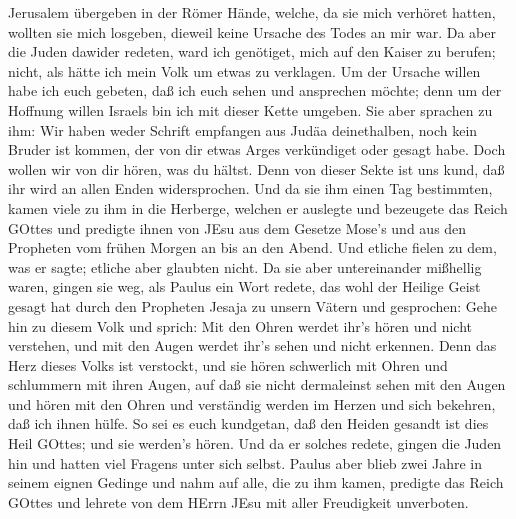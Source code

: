 Jerusalem übergeben in der Römer Hände,  welche, da sie
mich verhöret hatten, wollten sie mich losgeben, dieweil keine Ursache
des Todes an mir war.  Da aber die Juden dawider redeten,
ward ich genötiget, mich auf den Kaiser zu berufen; nicht, als hätte ich
mein Volk um etwas zu verklagen.  Um der Ursache willen
habe ich euch gebeten, daß ich euch sehen und ansprechen möchte; denn um
der Hoffnung willen Israels bin ich mit dieser Kette umgeben.
 Sie aber sprachen zu ihm: Wir haben weder Schrift
empfangen aus Judäa deinethalben, noch kein Bruder ist kommen, der von
dir etwas Arges verkündiget oder gesagt habe.  Doch wollen
wir von dir hören, was du hältst. Denn von dieser Sekte ist uns kund,
daß ihr wird an allen Enden widersprochen.  Und da sie ihm
einen Tag bestimmten, kamen viele zu ihm in die Herberge, welchen er
auslegte und bezeugete das Reich GOttes und predigte ihnen von JEsu aus
dem Gesetze Mose's und aus den Propheten vom frühen Morgen an bis an den
Abend.  Und etliche fielen zu dem, was er sagte; etliche
aber glaubten nicht.  Da sie aber untereinander mißhellig
waren, gingen sie weg, als Paulus ein Wort redete, das wohl der Heilige
Geist gesagt hat durch den Propheten Jesaja zu unsern Vätern
 und gesprochen: Gehe hin zu diesem Volk und sprich: Mit
den Ohren werdet ihr's hören und nicht verstehen, und mit den Augen
werdet ihr's sehen und nicht erkennen.  Denn das Herz
dieses Volks ist verstockt, und sie hören schwerlich mit Ohren und
schlummern mit ihren Augen, auf daß sie nicht dermaleinst sehen mit den
Augen und hören mit den Ohren und verständig werden im Herzen und sich
bekehren, daß ich ihnen hülfe.  So sei es euch kundgetan,
daß den Heiden gesandt ist dies Heil GOttes; und sie werden's hören.
 Und da er solches redete, gingen die Juden hin und hatten
viel Fragens unter sich selbst.  Paulus aber blieb zwei
Jahre in seinem eignen Gedinge und nahm auf alle, die zu ihm kamen,
 predigte das Reich GOttes und lehrete von dem HErrn JEsu
mit aller Freudigkeit unverboten.
